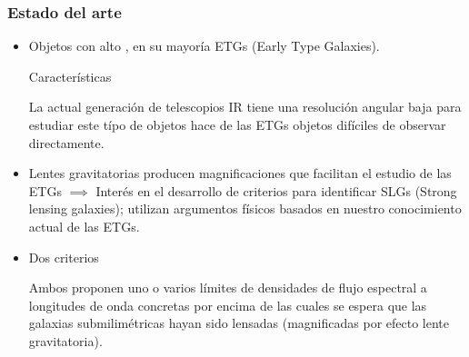\documentclass[8pt]{beamer}
\begin{document}
\begin{frame}

\frametitle{Estado del arte}

\begin{itemize}

\item Objetos con alto \rt, en su mayoría ETGs (Early Type Galaxies).

Características

La actual generación de telescopios IR tiene una resolución angular baja para estudiar este típo de objetos \maths{\implies} hace de las ETGs objetos difíciles de observar directamente.

\item Lentes gravitatorias producen magnificaciones que facilitan el estudio de las ETGs $\implies$ Interés en el desarrollo de criterios para identificar SLGs (Strong lensing galaxies); utilizan argumentos físicos basados en nuestro conocimiento actual de las ETGs.

\item Dos criterios \maths{
 \begin{cases}
 
    \text{\negrello} \\
    
    \text{\gonzalez}\\
 \end{cases}
}

Ambos proponen uno o varios límites de densidades de flujo espectral a longitudes de onda concretas por encima de las cuales se espera que las galaxias submilimétricas hayan
sido lensadas (magnificadas por efecto lente gravitatoria).

\end{itemize}

\end{frame}
\end{document}
